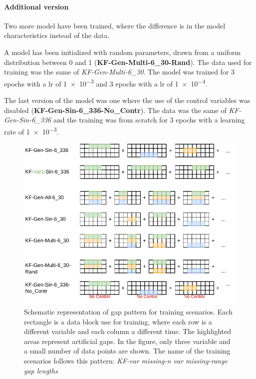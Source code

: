 \documentclass{article}
\begin{document}
\paragraph{Additional version} Two more model have been trained, where the difference is in the model characteristics instead of the data.

A model has been initialized with random parameters, drawn from a uniform distribution between 0 and 1 (\textbf{KF-Gen-Multi-6\_30-Rand}). The data used for training was the same of  \textit{KF-Gen-Multi-6\_30}. The model was trained for 3 epochs with a lr of \num{1e-3} and 3 epochs with a lr of \num{1e-4}. 

The last version of the model was one where the use of the control variables was disabled (\textbf{KF-Gen-Sin-6\_336-No\_Contr}). The data was the same of \textit{KF-Gen-Sin-6\_336} and the training was from scratch for \num{3} epochs with a learning rate of \num{1e-3}.

\begin{figure}
\centerline{\includegraphics[width=\textwidth]{training scenarios}}
\caption{Schematic representation of gap pattern for training scenarios. Each rectangle is a data block use for training, where each row is a different variable and each column a different time. The highlighted areas represent artificial gaps. In the figure, only three variable and a small number of data points are shown. The name of the training scenarios follows this pattern: \textit{KF-\textlangle var missing\textrangle-\textlangle n var missing\textrangle-\textlangle range gap lengths }}
\label{fig:training}
\end{figure}
\end{document}

